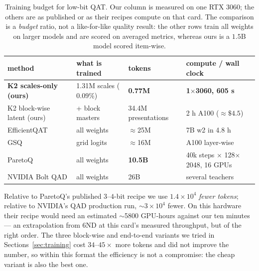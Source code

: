 \documentclass[11pt,a4paper]{article}
\begin{document}
\begin{table}[t]
\centering\footnotesize
\setlength{\tabcolsep}{3.5pt}
\caption{Training budget for low-bit QAT. Our column is measured on one RTX 3060; the others are
as published or as their recipes compute on that card. The comparison is a \emph{budget} ratio, not
a like-for-like quality result: the other rows train all weights on larger models and are scored on
averaged metrics, whereas ours is a $1.5$B model scored item-wise.}
\label{tab:budget}
\begin{tabular}{llll}
\toprule
method & what is trained & tokens & compute / wall clock\\
\midrule
\textbf{K2 scales-only (ours)} & 1.31M scales ($0.09\%$) & \textbf{0.77M} & \textbf{1$\times$3060, 605 s}\\
K2 block-wise latent (ours) & + block masters & 34.4M presentations & 2 h A100 ($\approx\$4.5$)\\
EfficientQAT & all weights & $\approx$25M & 7B w2 in 4.8 h\\
GSQ & grid logits & $\approx$16M & A100 layer-wise\\
ParetoQ & all weights & \textbf{10.5B} & 40k steps $\times$ 128$\times$2048, 16 GPUs\\
NVIDIA Bolt QAD & all weights & 26B & several teachers\\
\bottomrule
\end{tabular}
\end{table}

Relative to ParetoQ's published $3$--$4$-bit recipe we use $1.4\times10^4$ \emph{fewer tokens};
relative to NVIDIA's QAD production run, $\sim3\times10^4$ fewer. On this hardware their recipe
would need an estimated $\sim$5800 GPU-hours against our ten minutes --- an extrapolation from
6ND at this card's measured throughput, but of the right order. The three block-wise and
end-to-end variants we tried in Sections~\ref{sec:training} cost $34$--$45\times$ more tokens and
did not improve the number, so within this format the efficiency is not a compromise: the cheap
variant is also the best one.
\end{document}
